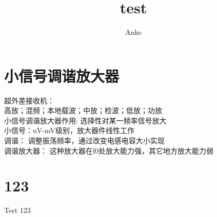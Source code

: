 \documentclass[UTF8,a4paper,12pt]{ctexart}
\title{test}
\author{Anke}
\begin{document}
\maketitle
    \section{小信号调谐放大器}
    
    超外差接收机：\\
    高放；混频；本地载波；中放；检波；低放；功放\\
    小信号调谐放大器作用: 选择性对某一频率信号放大\\
    小信号：uV-mV级别，放大器件线性工作\\
    调谐： 调整振荡频率，通过改变电感电容大小实现\\
    调谐放大器： 这种放大器在f0处放大能力强，其它地方放大能力弱\\
    \section{123}

    Test 123
    
    
\end{document}
